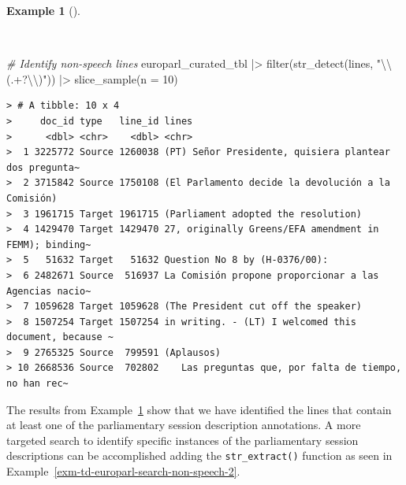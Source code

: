 \documentclass[
  letterpaper,
  DIV=11,
  numbers=noendperiod]{scrreport}
\newenvironment{Shaded}{\begin{snugshade}}{\end{snugshade}}
\newcommand{\AttributeTok}[1]{\textcolor[rgb]{0.00,0.00,0.00}{#1}}
\newcommand{\CommentTok}[1]{\textcolor[rgb]{0.00,0.00,0.00}{\textit{#1}}}
\newcommand{\DecValTok}[1]{\textcolor[rgb]{0.00,0.00,0.00}{#1}}
\newcommand{\FunctionTok}[1]{\textcolor[rgb]{0.00,0.00,0.00}{#1}}
\newcommand{\NormalTok}[1]{\textcolor[rgb]{0.00,0.00,0.00}{#1}}
\newcommand{\SpecialCharTok}[1]{\textcolor[rgb]{0.00,0.00,0.00}{#1}}
\newcommand{\StringTok}[1]{\textcolor[rgb]{0.00,0.00,0.00}{#1}}
\theoremstyle{definition}
\newtheorem{example}{Example}[chapter]
\theoremstyle{remark}
\begin{document}
\begin{example}[]\protect\hypertarget{exm-td-europarl-search-non-speech}{}\label{exm-td-europarl-search-non-speech}

~

\begin{Shaded}
\begin{Highlighting}[]
\CommentTok{\# Identify non{-}speech lines}
\NormalTok{europarl\_curated\_tbl }\SpecialCharTok{|\textgreater{}}
  \FunctionTok{filter}\NormalTok{(}\FunctionTok{str\_detect}\NormalTok{(lines, }\StringTok{"}\SpecialCharTok{\textbackslash{}\textbackslash{}}\StringTok{(.+?}\SpecialCharTok{\textbackslash{}\textbackslash{}}\StringTok{)"}\NormalTok{)) }\SpecialCharTok{|\textgreater{}}
  \FunctionTok{slice\_sample}\NormalTok{(}\AttributeTok{n =} \DecValTok{10}\NormalTok{) }
\end{Highlighting}
\end{Shaded}

\begin{verbatim}
> # A tibble: 10 x 4
>     doc_id type   line_id lines                                                 
>      <dbl> <chr>    <dbl> <chr>                                                 
>  1 3225772 Source 1260038 (PT) Señor Presidente, quisiera plantear dos pregunta~
>  2 3715842 Source 1750108 (El Parlamento decide la devolución a la Comisión)    
>  3 1961715 Target 1961715 (Parliament adopted the resolution)                   
>  4 1429470 Target 1429470 27, originally Greens/EFA amendment in FEMM); binding~
>  5   51632 Target   51632 Question No 8 by (H-0376/00):                         
>  6 2482671 Source  516937 La Comisión propone proporcionar a las Agencias nacio~
>  7 1059628 Target 1059628 (The President cut off the speaker)                   
>  8 1507254 Target 1507254 in writing. - (LT) I welcomed this document, because ~
>  9 2765325 Source  799591 (Aplausos)                                            
> 10 2668536 Source  702802    Las preguntas que, por falta de tiempo, no han rec~
\end{verbatim}

\end{example}

The results from Example~\ref{exm-td-europarl-search-non-speech} show
that we have identified the lines that contain at least one of the
parliamentary session description annotations. A more targeted search to
identify specific instances of the parliamentary session descriptions
can be accomplished adding the \texttt{str\_extract()} function as seen
in Example~\ref{exm-td-europarl-search-non-speech-2}.
\end{document}
